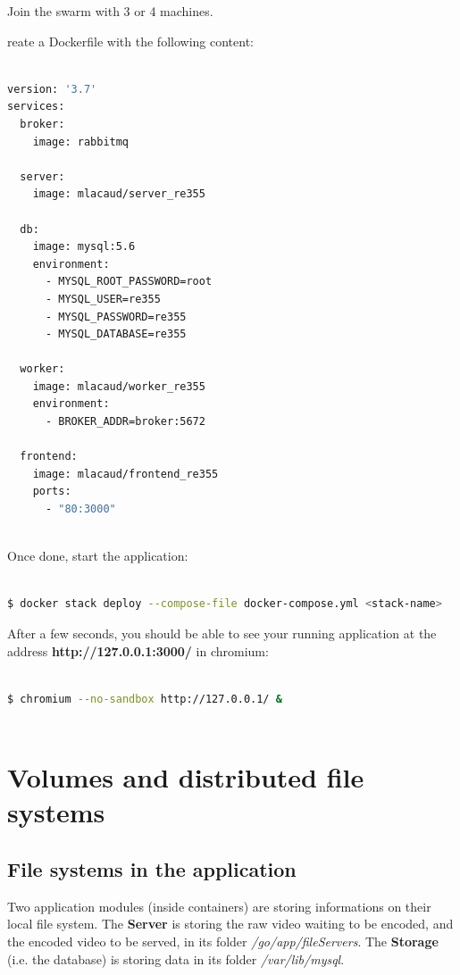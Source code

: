\documentclass[a4paper,11pt]{exam}
\begin{document}
Join the swarm with 3 or 4 machines.

reate a Dockerfile with the following content:


\begin{lstlisting}[frame=single,language={sh}]  % Start your code-block

version: '3.7'
services:
  broker:
    image: rabbitmq

  server:
    image: mlacaud/server_re355

  db:
    image: mysql:5.6
    environment:
      - MYSQL_ROOT_PASSWORD=root
      - MYSQL_USER=re355
      - MYSQL_PASSWORD=re355
      - MYSQL_DATABASE=re355

  worker:
    image: mlacaud/worker_re355
    environment:
      - BROKER_ADDR=broker:5672

  frontend:
    image: mlacaud/frontend_re355
    ports:
	  - "80:3000"
	  
\end{lstlisting}

Once done, start the application:

\begin{lstlisting}[frame=single,language={sh}]  % Start your code-block

$ docker stack deploy --compose-file docker-compose.yml <stack-name>

\end{lstlisting}

After a few seconds, you should be able to see your running application at the address \textbf{http://127.0.0.1:3000/} in chromium:

\begin{lstlisting}[frame=single,language={sh}]  % Start your code-block

$ chromium --no-sandbox http://127.0.0.1/ &
		
\end{lstlisting}

\clearpage

\section{Volumes and distributed file systems}

\subsection{File systems in the application}

Two application modules (inside containers) are storing informations on their local file system. 
The \textbf{Server} is storing the raw video waiting to be encoded, and the encoded video to be served, in its folder \textit{/go/app/fileServers}. 
The \textbf{Storage} (i.e. the database) is storing data in its folder \textit{/var/lib/mysql}. 
\end{document}
